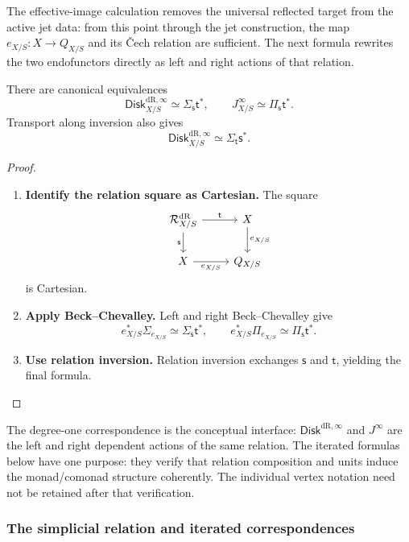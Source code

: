 The effective-image calculation removes the universal reflected target from the
active jet data: from this point through the jet construction, the map
\(e_{X/S}:X\to Q_{X/S}\) and its \v{C}ech relation are sufficient. The next
formula rewrites the two endofunctors directly as left and right actions of
that relation.

\begin{proposition}
\label{prop:relation-jet-formulas}
There are canonical equivalences
\[
  \mathsf{Disk}^{\mathrm{dR},\infty}_{X/S}
  \simeq
  \Sigma_{\mathsf s}\mathsf t^*,
  \qquad
  J^\infty_{X/S}
  \simeq
  \Pi_{\mathsf s}\mathsf t^*.
\]
Transport along inversion also gives
\[
  \mathsf{Disk}^{\mathrm{dR},\infty}_{X/S}
  \simeq
  \Sigma_{\mathsf t}\mathsf s^*.
\]
\end{proposition}

\begin{proof}
\leavevmode
\begin{enumerate}[label=\textup{(\arabic*)}]
    \item \textbf{Identify the relation square as Cartesian.}
The square
\[
\begin{tikzcd}
\mathcal R^{\mathrm{dR}}_{X/S}
  \ar[r,"\mathsf t"]
  \ar[d,"\mathsf s"']
&
X \ar[d,"e_{X/S}"]
\\
X \ar[r,"e_{X/S}"']
&
Q_{X/S}
\end{tikzcd}
\]
is Cartesian.

    \item \textbf{Apply Beck--Chevalley.}
Left and right Beck--Chevalley give
\[
  e_{X/S}^*\Sigma_{e_{X/S}}
  \simeq
  \Sigma_{\mathsf s}\mathsf t^*,
  \qquad
  e_{X/S}^*\Pi_{e_{X/S}}
  \simeq
  \Pi_{\mathsf s}\mathsf t^*.
\]

    \item \textbf{Use relation inversion.}
Relation inversion exchanges \(\mathsf s\) and \(\mathsf t\), yielding the
final formula.
\end{enumerate}
\end{proof}

The degree-one correspondence is the conceptual interface:
\(\mathsf{Disk}^{\mathrm{dR},\infty}\) and \(J^\infty\) are the left and
right dependent actions of the same relation. The iterated formulas below have
one purpose: they verify that relation composition and units induce the
monad/comonad structure coherently. The individual vertex notation need not be
retained after that verification.

\subsubsection{The simplicial relation and iterated correspondences}

